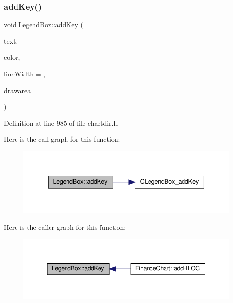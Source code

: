 \subsubsection{\texorpdfstring{add\+Key()}{addKey()}\hspace{0.1cm}{\footnotesize\ttfamily [1/2]}}
{\footnotesize\ttfamily void Legend\+Box\+::add\+Key (\begin{DoxyParamCaption}\item[{const char $\ast$}]{text,  }\item[{int}]{color,  }\item[{int}]{line\+Width = {},  }\item[{const \hyperlink{class_draw_area}{Draw\+Area} $\ast$}]{drawarea = {} }\end{DoxyParamCaption})\hspace{0.3cm}{\ttfamily [inline]}}



Definition at line 985 of file chartdir.\+h.

Here is the call graph for this function\+:
\nopagebreak
\begin{figure}[H]
\begin{center}
\leavevmode
\includegraphics[width=331pt]{class_legend_box_ac1c4a3c6176a53220b19fef775dcd201_cgraph}
\end{center}
\end{figure}
Here is the caller graph for this function\+:
\nopagebreak
\begin{figure}[H]
\begin{center}
\leavevmode
\includegraphics[width=345pt]{class_legend_box_ac1c4a3c6176a53220b19fef775dcd201_icgraph}
\end{center}
\end{figure}
\mbox{\label{class_legend_box_a41e95938141756d0c9e4c2d6b15da6f0}} 
